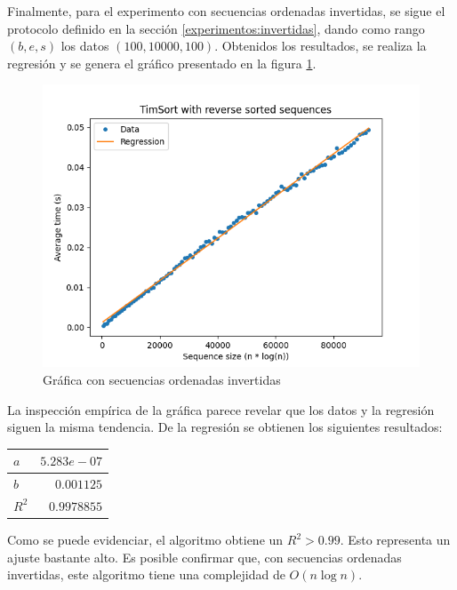 \documentclass[letter]{article}
\begin{document}
Finalmente, para el experimento con secuencias ordenadas invertidas, se sigue el protocolo definido en la sección \ref{experimentos:invertidas}, dando como rango $(b,e,s)$ los datos $(100,10000,100)$. Obtenidos los resultados, se realiza la regresión y se genera el gráfico presentado en la figura \ref{fig:grafica:invertidas}.

\vspace{-1em}
\begin{figure}[!htb]
\centering
\includegraphics[scale=0.5]{img/plot_reverse_sorted.png}
\vspace{-1em}
\caption{Gráfica con secuencias ordenadas invertidas}
\label{fig:grafica:invertidas}
\end{figure}

La inspección empírica de la gráfica parece revelar que los datos y la regresión siguen la misma tendencia. De la regresión se obtienen los siguientes resultados: \par

\begin{table}[!ht]
\begin{tabular}{|l|r|}
\hline
$a$   & $5.283e-07$ \\ \hline
$b$   & $0.001125$ \\ \hline
$R^2$ & $0.9978855$ \\ \hline
\end{tabular}
\end{table}

Como se puede evidenciar, el algoritmo obtiene un $R^2 > 0.99$. Esto representa un ajuste bastante alto. Es posible confirmar que, con secuencias ordenadas invertidas, este algoritmo tiene una complejidad de $O(n \log n)$.
\end{document}
